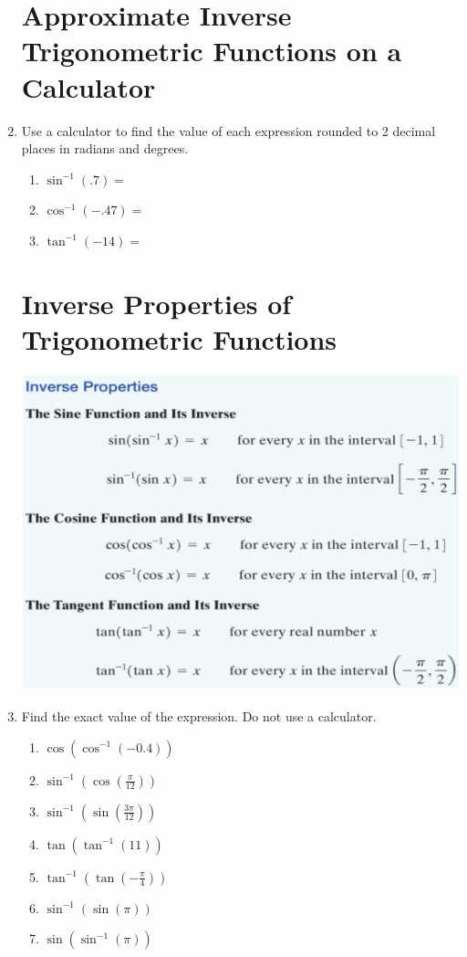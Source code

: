 \documentclass[11pt]{article}
\begin{document}
\begin{enumerate}
\begin{enumerate}
\end{enumerate}


\section{Approximate Inverse Trigonometric Functions on a Calculator}
\item Use a calculator to find the value of each expression rounded to 2 decimal places in radians and degrees.
\begin{enumerate}
\item $\sin^{-1}(.7)=$\\
\item $\cos^{-1}(-.47)=$\\
\item $\tan^{-1}(-14)=$\\
\end{enumerate}


\newpage

\section{Inverse Properties of Trigonometric Functions}
\includegraphics[scale=.7]{inverseprops}

\item Find the exact value of the expression.  Do not use a calculator.
\begin{enumerate}
\item $\displaystyle \cos(\cos^{-1}(-0.4))$\vfill
\item  $\displaystyle \sin^{-1}(\cos(\frac{\pi}{12}))$\vfill
\item $\displaystyle \sin^{-1}(\sin(\frac{3\pi}{12}))$\vfill
\newpage
\item $\displaystyle \tan(\tan^{-1}(11))$\vfill
\item  $\displaystyle \tan^{-1}(\tan(-\frac{\pi}{4}))$\vfill
\item  $\displaystyle \sin^{-1}(\sin(\pi))$\vfill
\item $\displaystyle \sin(\sin^{-1}(\pi))$\vfill
\end{enumerate}


\end{enumerate}
\end{document}
